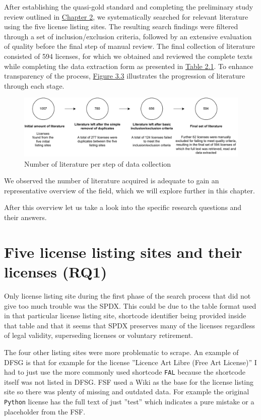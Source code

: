 After establishing the quasi-gold standard and completing the preliminary study review outlined in \hyperref[methods]{Chapter 2}, we systematically searched for relevant literature using the five license listing sites. The resulting search findings were filtered through a set of inclusion/exclusion criteria, followed by an extensive evaluation of quality before the final step of manual review. The final collection of literature consisted of 594 licenses, for which we obtained and reviewed the complete texts while completing the data extraction form as presented in \hyperref[table:extraction]{Table 2.1}. To enhance transparency of the process, \hyperref[fig:3-3]{Figure 3.3} illustrates the progression of literature through each stage.
\begin{figure}
	\centering
	\includegraphics[scale=0.8]{figures/figure-3-3.pdf}
	\caption{Number of literature per step of data collection}
	\label{fig:3-3}
\end{figure}
We observed the number of literature acquired is adequate to gain an representative overview of the field, which we will explore further in this chapter.

After this overview let us take a look into the specific research questions and their answers.

\section{Five license listing sites and their licenses (RQ1)}
Only license listing site during the first phase of the search process that did not give too much trouble was the SPDX. This could be due to the table format used in that particular license listing site, shortcode identifier being provided inside that table and that it seems that SPDX preserves many of the licenses regardless of legal validity, superseding licenses or voluntary retirement.

The four other listing sites were more problematic to scrape. An example of DFSG is that for example for the license ''Licence Art Libre (Free Art License)'' I had to just use the more commonly used shortcode \texttt{FAL} because the shortcode itself was not listed in DFSG. FSF used a Wiki as the base for the license listing site so there was plenty of missing and outdated data. For example the original \texttt{Python} license has the full text of just ''test'' which indicates a pure mistake or a placeholder from the FSF.

